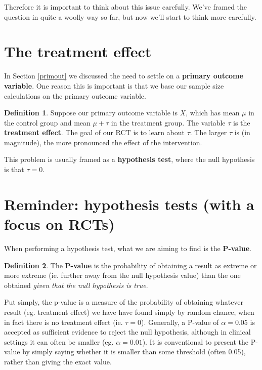 \documentclass[
  openany]{book}
\theoremstyle{definition}
\newtheorem{definition}{Definition}[chapter]
\theoremstyle{definition}
\theoremstyle{definition}
\theoremstyle{definition}
\theoremstyle{remark}
\begin{document}
Therefore it is important to think about this issue carefully. We've framed the question in quite a woolly way so far, but now we'll start to think more carefully.

\hypertarget{the-treatment-effect}{%
\section{The treatment effect}\label{the-treatment-effect}}

In Section \ref{primout} we discussed the need to settle on a \textbf{primary outcome variable}. One reason this is important is that we base our sample size calculations on the primary outcome variable.

\begin{definition}
Suppose our primary outcome variable is \(X\), which has mean \(\mu\) in the control group and mean \(\mu + \tau\) in the treatment group. The variable \(\tau\) is the \textbf{treatment effect}. The goal of our RCT is to learn about \(\tau\). The larger \(\tau\) is (in magnitude), the more pronounced the effect of the intervention.
\end{definition}

This problem is usually framed as a \textbf{hypothesis test}, where the null hypothesis is that \(\tau=0\).

\hypertarget{reminder-hypothesis-tests-with-a-focus-on-rcts}{%
\section{Reminder: hypothesis tests (with a focus on RCTs)}\label{reminder-hypothesis-tests-with-a-focus-on-rcts}}

When performing a hypothesis test, what we are aiming to find is the \textbf{P-value}.

\begin{definition}
The \textbf{P-value} is the probability of obtaining a result as extreme or more extreme (ie. further away from the null hypothesis value) than the one obtained \emph{given that the null hypothesis is true}.
\end{definition}

Put simply, the p-value is a measure of the probability of obtaining whatever result (eg. treatment effect) we have have found simply by random chance, when in fact there is no treatment effect (ie. \(\tau=0\)). Generally, a P-value of \(\alpha = 0.05\) is accepted as sufficient evidence to reject the null hypothesis, although in clinical settings it can often be smaller (eg. \(\alpha = 0.01\)). It is conventional to present the P-value by simply saying whether it is smaller than some threshold (often 0.05), rather than giving the exact value.
\end{document}
